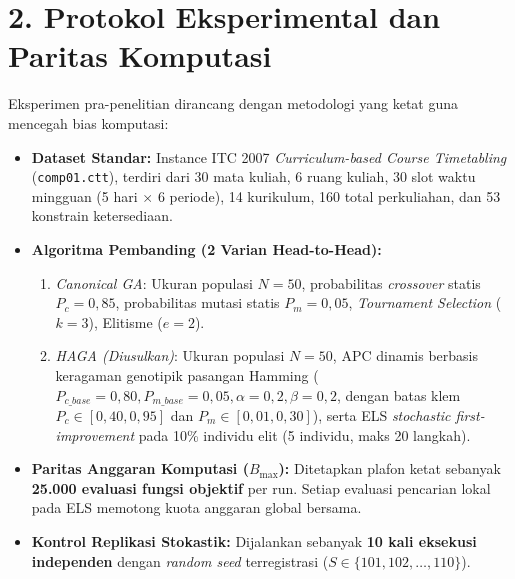 \documentclass[a4paper,11pt]{article}
\begin{document}
\section*{2. Protokol Eksperimental dan Paritas Komputasi}
Eksperimen pra-penelitian dirancang dengan metodologi yang ketat guna mencegah bias komputasi:
\begin{itemize}\setlength\itemsep{0.1em}
    \item \textbf{Dataset Standar:} Instance ITC 2007 \textit{Curriculum-based Course Timetabling} (\texttt{comp01.ctt}), terdiri dari 30 mata kuliah, 6 ruang kuliah, 30 slot waktu mingguan (5 hari $\times$ 6 periode), 14 kurikulum, 160 total perkuliahan, dan 53 konstrain ketersediaan.
    \item \textbf{Algoritma Pembanding (2 Varian Head-to-Head):}
    \begin{enumerate}\setlength\itemsep{0em}
        \item \textit{Canonical GA}: Ukuran populasi $N = 50$, probabilitas \textit{crossover} statis $P_c = 0{,}85$, probabilitas mutasi statis $P_m = 0{,}05$, \textit{Tournament Selection} ($k = 3$), Elitisme ($e = 2$).
        \item \textit{HAGA (Diusulkan)}: Ukuran populasi $N = 50$, APC dinamis berbasis keragaman genotipik pasangan Hamming ($P_{c\_base}=0{,}80, P_{m\_base}=0{,}05, \alpha=0{,}2, \beta=0{,}2$, dengan batas klem $P_c \in [0{,}40, 0{,}95]$ dan $P_m \in [0{,}01, 0{,}30]$), serta ELS \textit{stochastic first-improvement} pada 10\% individu elit (5 individu, maks 20 langkah).
    \end{enumerate}
    \item \textbf{Paritas Anggaran Komputasi ($B_{\max}$):} Ditetapkan plafon ketat sebanyak \textbf{25.000 evaluasi fungsi objektif} per run. Setiap evaluasi pencarian lokal pada ELS memotong kuota anggaran global bersama.
    \item \textbf{Kontrol Replikasi Stokastik:} Dijalankan sebanyak \textbf{10 kali eksekusi independen} dengan \textit{random seed} terregistrasi ($S \in \{101, 102, \dots, 110\}$).
\end{itemize}
\end{document}

